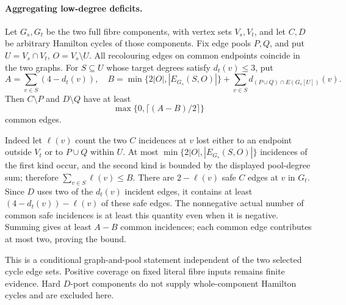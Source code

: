 \paragraph{Aggregating low-degree deficits.}
Let $G_s,G_t$ be the two full fibre components, with vertex sets $V_s,V_t$,
and let $C,D$ be arbitrary Hamilton cycles of those components.
Fix edge pools $P,Q$, and put $U=V_s\cap V_t$, $O=V_s\setminus U$.
All recolouring edges on common endpoints coincide in the two graphs.
For $S\subseteq U$ whose target degrees satisfy $d_t(v)\le3$, put
\[
 A=\sum_{v\in S}(4-d_t(v)),\quad
 B=\min\{2|O|,|E_{G_s}(S,O)|\}
   +\sum_{v\in S}d_{(P\cup Q)\cap E(G_s[U])}(v).
\]
Then $C\setminus P$ and $D\setminus Q$ have at least
\[
 \max\{0,\lceil(A-B)/2\rceil\}
\]
common edges.

Indeed let $\ell(v)$ count the two $C$ incidences at $v$ lost either
to an endpoint outside $V_t$ or to $P\cup Q$ within $U$.
At most $\min\{2|O|,|E_{G_s}(S,O)|\}$ incidences of the first kind
occur, and the second kind is bounded by the displayed pool-degree sum;
therefore $\sum_{v\in S}\ell(v)\le B$.
There are $2-\ell(v)$ safe $C$ edges at $v$ in $G_t$.
Since $D$ uses two of the $d_t(v)$ incident edges, it contains at least
$(4-d_t(v))-\ell(v)$ of these safe edges. The nonnegative actual
number of common safe incidences is at least this quantity even when
it is negative. Summing gives at least $A-B$ common incidences;
each common edge contributes at most two, proving the bound.

This is a conditional graph-and-pool statement independent of the
two selected cycle edge sets. Positive coverage on fixed literal
fibre inputs remains finite evidence. Hard $D$-port components do
not supply whole-component Hamilton cycles and are excluded here.
